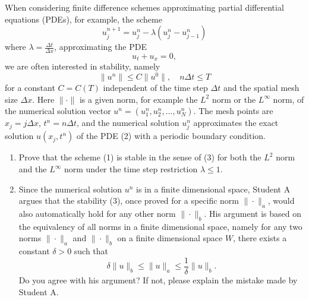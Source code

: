 \begin{exercise}
\label{applied:2010:11}
When considering finite difference schemes approximating partial differential equations (PDEs), for example, the scheme
\[
u_j^{n+1} = u_j^n - \lambda(u_j^n - u_{j-1}^n) \tag{1}
\]
where $\lambda = \frac{\Delta t}{\Delta x}$, approximating the PDE
\[
u_t + u_x = 0, \tag{2}
\]
we are often interested in stability, namely
\[
\|u^n\| \leq C\|u^0\|, \quad n \Delta t \leq T \tag{3}
\]
for a constant $C = C(T)$ independent of the time step $\Delta t$ and the spatial mesh size $\Delta x$. Here $\|\cdot\|$ is a given norm, for example the $L^2$ norm or the $L^\infty$ norm, of the numerical solution vector $u^n = (u_1^n, u_2^n, \dots, u_N^n)$. The mesh points are $x_j = j \Delta x$, $t^n = n \Delta t$, and the numerical solution $u_j^n$ approximates the exact solution $u(x_j, t^n)$ of the PDE (2) with a periodic boundary condition.

\begin{enumerate}
    \item Prove that the scheme (1) is stable in the sense of (3) for both the $L^2$ norm and the $L^\infty$ norm under the time step restriction $\lambda \leq 1$.
    \item Since the numerical solution $u^n$ is in a finite dimensional space, Student A argues that the stability (3), once proved for a specific norm $\|\cdot\|_a$, would also automatically hold for any other norm $\|\cdot\|_b$. His argument is based on the equivalency of all norms in a finite dimensional space, namely for any two norms $\|\cdot\|_a$ and $\|\cdot\|_b$ on a finite dimensional space $W$, there exists a constant $\delta > 0$ such that
    \[
    \delta \|u\|_b \le \|u\|_a \le \frac{1}{\delta} \|u\|_b.
    \]
    Do you agree with his argument? If not, please explain the mistake made by Student A.
\end{enumerate}
\end{exercise}

